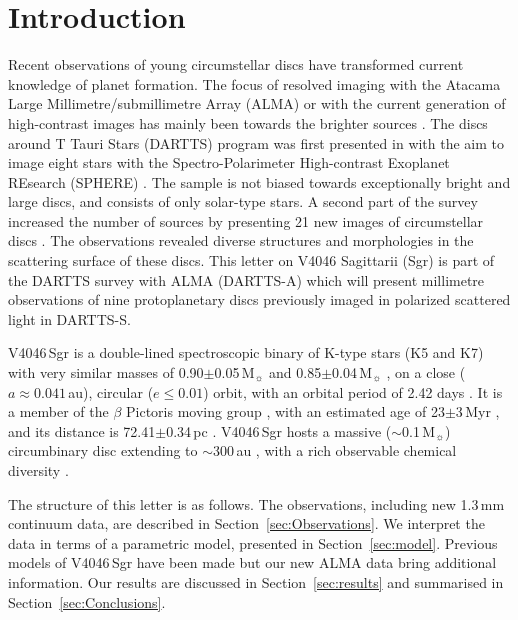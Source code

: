 \documentclass[letters,usenatbib,times]{mnras}
\begin{document}
\section{Introduction} \label{sec:Introduction}

Recent observations of young circumstellar discs have transformed current knowledge of planet formation. The focus of resolved imaging with the Atacama Large Millimetre/submillimetre Array (ALMA) or with 
the current generation of high-contrast images 
has mainly been towards the brighter sources \citep{Andrews2020arXiv200105007A}. The discs around T Tauri Stars (DARTTS) program was first presented in \citet{Avenhaus_2018} with the aim to image eight stars with the Spectro-Polarimeter High-contrast Exoplanet REsearch (SPHERE) \citep{2019A&A...631A.155B}. The sample is not biased towards exceptionally bright and large discs, and consists of only solar-type stars. A second part of the survey increased the number of sources by presenting 21 new images of circumstellar discs \citep{Garufi2020}. The observations revealed diverse structures and morphologies in the scattering surface of these discs. This letter on V4046 Sagittarii (Sgr) is part of the DARTTS survey with ALMA (DARTTS-A) which will present millimetre observations of nine protoplanetary discs previously imaged in polarized scattered light in DARTTS-S. 

V4046\,Sgr is a double-lined spectroscopic binary of K-type stars (K5 and K7) with very similar masses of 0.90$\pm$0.05\,M$_{\sun}$ and 0.85$\pm$0.04\,M$_{\sun}$ \citep{Rosenfeld_2012}, on a close ($a \approx 0.041$\,au), circular ($e\leq0.01$) orbit, with an orbital period of 2.42 days \citep{refId0}. It is a member of the $\beta$ Pictoris moving group \citep{Zuckerman_2004}, with an estimated age of 23$\pm$3\,Myr \citep{Mamajek_2014}, and its distance is 72.41$\pm$0.34\,pc \citep{Gaia}. V4046\,Sgr hosts a massive ($\sim$0.1\,M$_{\sun}$) circumbinary disc extending to $\sim$300\,au \citep{Rosenfeld_2013, Rodriguez_2010}, with a rich observable chemical diversity \citep{Kastner_2018}. 

The structure of this letter is as follows. The observations, including new 1.3\,mm continuum data, are described in Section~\ref{sec:Observations}. We interpret the data in terms of a parametric model, presented in Section~\ref{sec:model}. Previous models of V4046\,Sgr have been made \citep{Ru_z_Rodr_guez_2019, Rosenfeld_2013, 2019ApJ...882..160Q} but our new ALMA data bring additional information. Our results are discussed in Section~\ref{sec:results} and summarised in Section~\ref{sec:Conclusions}.
\end{document}
